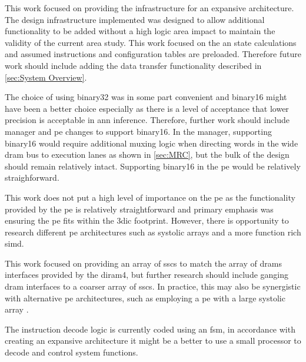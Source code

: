 This work focused on providing the infrastructure for an expansive architecture.
The design infrastructure implemented was designed to allow additional functionality to be added without a high logic area impact to maintain the validity of the current area study.
This work focused on the \ac{an} state calculations and assumed instructions and configuration tables are preloaded.
Therefore future work should include adding the data transfer functionality described in \ref{sec:System Overview}.

The choice of using \ac{binary32} was in some part convenient and \ac{binary16} might have been a better choice especially as there is a level of acceptance that lower precision is acceptable in \ac{ann} inference.
Therefore, further work should include manager and \ac{pe} changes to support \ac{binary16}.
In the manager, supporting \ac{binary16} would require additional muxing logic when directing words in the wide \ac{dram} bus to execution lanes as shown in \ref{sec:MRC}, but the bulk of the design should remain relatively intact.
Supporting \ac{binary16} in the \ac{pe} would be relatively straighforward.

This work does not put a high level of importance on the \ac{pe} as the functionality provided by the \ac{pe} is relatively straightforward and primary emphasis was ensuring the \ac{pe} fits within the \ac{3dic} footprint.
However, there is opportunity to research different \ac{pe} architectures such as systolic arrays and a more function rich \ac{simd}.

This work focused on providing an array of \acp{ssc} to match the array of \acp{dram} interfaces provided by the \ac{diram4}, but further research should include ganging \ac{dram} interfaces to a coarser array of \acp{ssc}.
In practice, this may also be synergistic with alternative \ac{pe} architectures, such as employing a \ac{pe} with a large systolic array \cite{tensorflow2015-whitepaper}.

The instruction decode logic is currently coded using an \ac{fsm}, in accordance with creating an expansive architecture it might be a better to use a small processor to decode and control system functions.

